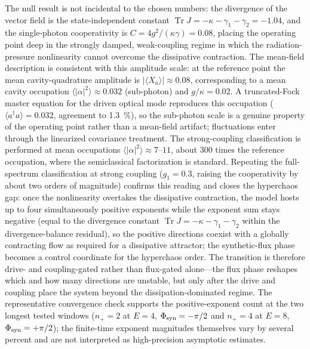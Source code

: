 \documentclass[aip,cha,reprint]{revtex4-2}
\newcommand{\Tr}{\operatorname{Tr}}
\begin{document}
The null result is not incidental to the chosen numbers: the divergence of the vector
field is the state-independent constant $\Tr J=-\kappa-\gamma_1-\gamma_2=\num{-1.04}$,
and the single-photon cooperativity is $C=4g^2/(\kappa\gamma)=\num{0.08}$,
placing the operating point deep in the strongly damped, weak-coupling regime in which
the radiation-pressure nonlinearity cannot overcome the dissipative contraction.
The mean-field description is consistent with this amplitude scale: at the
reference point the mean cavity-quadrature amplitude is
$|\langle X_a\rangle|\approx\num{0.08}$, corresponding to a mean cavity
occupation $\langle|\alpha|^2\rangle\approx\num{0.032}$ (sub-photon) and
$g/\kappa=\num{0.02}$. A truncated-Fock master equation for the driven optical
mode reproduces this occupation ($\langle a^\dagger a\rangle=\num{0.032}$,
agreement to \SI{1.3}{\percent}), so the sub-photon scale is a genuine property
of the operating point rather than a mean-field artifact; fluctuations enter
through the linearized covariance treatment. The strong-coupling classification
is performed at mean occupations $\langle|\alpha|^2\rangle\approx\num{7}$--$\num{11}$,
about $\num{300}$ times the reference occupation, where the semiclassical
factorization is standard.
Repeating the full-spectrum classification at strong coupling
($g_1=\num{0.3}$, raising the cooperativity by about two orders of
magnitude) confirms this reading and closes the hyperchaos gap: once the
nonlinearity overtakes the dissipative contraction, the model hosts up to
four simultaneously positive exponents while the exponent sum stays negative (equal to the divergence constant $\Tr J=-\kappa-\gamma_1-\gamma_2$ within the divergence-balance residual), so the positive directions coexist with a globally contracting flow as required for a dissipative attractor; the synthetic-flux phase becomes
a control coordinate for the hyperchaos order. The transition is therefore
drive- and coupling-gated rather than flux-gated alone---the flux phase
reshapes which and how many directions are unstable, but only after the
drive and coupling place the system beyond the dissipation-dominated regime. The representative convergence check supports the positive-exponent count at the two
longest tested windows ($n_{+}=2$ at $E=\num{4}$, $\Phi_{\rm syn}=-\pi/2$ and
$n_{+}=4$ at $E=\num{8}$, $\Phi_{\rm syn}=+\pi/2$); the finite-time exponent
magnitudes themselves vary by several percent and are not interpreted as
high-precision asymptotic estimates.
\end{document}

